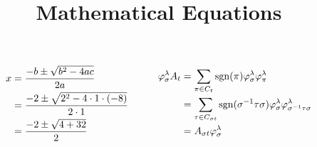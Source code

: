 \documentclass{article}
\begin{document}
\title{Mathematical Equations}
\date{}
\maketitle
\[
\begin{aligned}
\begin{split}
x &= \frac{-b \pm \sqrt{b^2 - 4ac}}{2a} \\
  &= \frac{-2 \pm \sqrt{2^2 - 4 \cdot 1 \cdot (-8)}}{2 \cdot 1} \\
  &= \frac{-2 \pm \sqrt{4 + 32}}{2}
\end{split}
\quad \quad \quad
\begin{split}
 \varphi_{\sigma}^{\lambda} A_{t} &= \sum_{\pi \in C_{t}} \operatorname{sgn}(\pi) \varphi_{\sigma}^{\lambda} \varphi_{\pi}^{\lambda} \notag \\
    &= \sum_{\tau \in C_{\sigma t}} \operatorname{sgn}(\sigma^{-1} \tau \sigma) \varphi_{\sigma}^{\lambda} \varphi_{\sigma^{-1} \tau \sigma}^{\lambda} \notag \\
    &= A_{\sigma t} \varphi_{\sigma}^{\lambda}
\end{split}
\end{aligned}
\]
\end{document}
